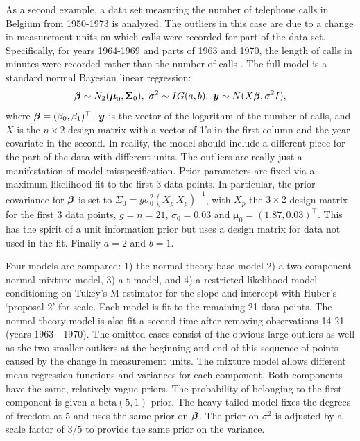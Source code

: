 \documentclass[ba]{imsart}
\def\bbeta{\mbox{\boldmath $\beta$}}
\newcommand{\by}{\mbox{\boldmath $y$}}
\newcommand{\response}[1]{{\color{blue}#1}}
\begin{document}

As a second example, a data set measuring the number of telephone calls in Belgium from 1950-1973 is analyzed. The outliers in this case are due to a change in measurement units on which calls were recorded for part of the data set. Specifically, for years 1964-1969 and parts of 1963 and 1970, the length of calls in minutes were recorded rather than the number of calls \citep{rousseeuw1987}. The full model is a standard normal Bayesian linear regression:
\begin{equation}
{\boldsymbol{\beta}}\sim N_{2}(\boldsymbol{\mu}_{0}, \boldsymbol{\Sigma}_{0}),\  \sigma^{2} \sim IG(a, b),\  \by \sim N(X\boldsymbol{\beta}, \sigma^{2} I),
\end{equation}
where $\bbeta = (\beta_{0}, \beta_{1})^{\top}$, $\by$ is the vector of the logarithm of the number of calls, and $X$ is the $n\times 2$ design matrix with a vector of 1's in the first column and the year covariate in the second. \response{In reality, the model should include a different piece for the part of the data with different units. The outliers are really just a manifestation of model misspecification.} Prior parameters are fixed via a maximum likelihood fit to the first 3 data points. In particular, the prior covariance for $\bbeta$ is set to $\Sigma_{0} = g\sigma_{0}^2 (X_{p}^{\top}X_{p})^{-1}$, with $X_{p}$ the $3\times 2$ design matrix for the first $3$ data points, $g=n=21$, $\sigma_{0} = 0.03$ and $\boldsymbol{\mu}_{0} = (1.87,  0.03)^{\top}$.  This has the spirit of a unit information prior \citep{kass1995reference} but uses a design matrix for data not used in the fit. Finally $a = 2$ and $b =1$.

Four models are compared: 1) the normal theory base model 2) a two component normal mixture model, 3) a t-model, and 4) a restricted likelihood model conditioning on Tukey's M-estimator for the slope and intercept with Huber's `proposal 2'  for scale. Each model is fit to the remaining 21 data points. The normal theory model is also fit a second time after removing observations 14-21 (years 1963 - 1970). The omitted cases consist of the obvious large outliers as well as the two smaller outliers at the beginning and end of this sequence of points caused by the change in measurement units. The mixture model allows different mean regression functions and variances for each component.  Both components have the same, relatively vague priors. The probability of belonging to the first component is given a $\text{beta}(5,1)$ prior. The heavy-tailed model fixes the degrees of freedom at 5 and uses the same prior on $\bbeta$.  The prior on $\sigma^2$ is adjusted by a scale factor of $3/5$ to provide the same prior on the variance.  
\end{document}

